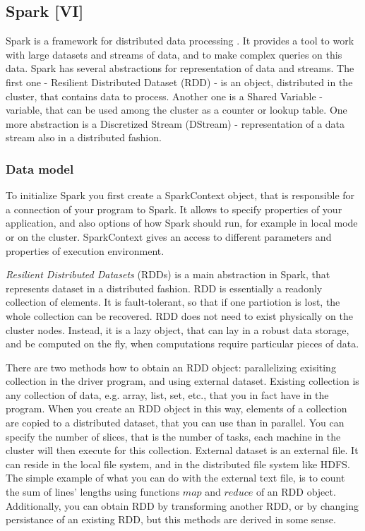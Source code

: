 \subsection{Spark [VI]}

Spark is a framework for distributed data processing \cite{Zaharia2010} \cite{Zaharia2013} \cite{Spark1} \cite{Spark2}.
It provides a tool to work with large datasets and streams of data, and to make complex queries on this data.
Spark has several abstractions for representation of data and streams.
The first one - Resilient Distributed Dataset (RDD) - is an object, distributed in the cluster, that contains data to process.
Another one is a Shared Variable - variable, that can be used among the cluster as a counter or lookup table.
One more abstraction is a Discretized Stream (DStream) - representation of a data stream also in a distributed fashion.

\subsubsection{Data model}

To initialize Spark you first create a SparkContext object, that is responsible for a connection of your program to Spark.
It allows to specify properties of your application, and also options of how Spark should run, for example in local mode or on the cluster.
SparkContext gives an access to different parameters and properties of execution environment.

\textit{Resilient Distributed Datasets} (RDDs) is a main abstraction in Spark, that represents dataset in a distributed fashion.
RDD is essentially a readonly collection of elements.
It is fault-tolerant, so that if one partiotion is lost, the whole collection can be recovered.
RDD does not need to exist physically on the cluster nodes.
Instead, it is a lazy object, that can lay in a robust data storage, and be computed on the fly, when computations require particular pieces of data.

There are two methods how to obtain an RDD object: parallelizing exisiting collection in the driver program, and using external dataset.
Existing collection is any collection of data, e.g. array, list, set, etc., that you in fact have in the program.
When you create an RDD object in this way, elements of a collection are copied to a distributed dataset, that you can use than in parallel.
You can specify the number of slices, that is the number of tasks, each machine in the cluster will then execute for this collection.
External dataset is an external file.
It can reside in the local file system, and in the distributed file system like HDFS.
The simple example of what you can do with the external text file, is to count the sum of lines' lengths using functions $map$ and $reduce$ of an RDD object. 
Additionally, you can obtain RDD by transforming another RDD, or by changing persistance of an existing RDD, but this methods are derived in some sense.


